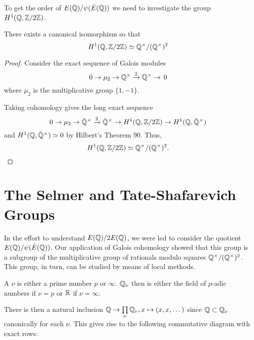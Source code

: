 \documentclass[12pt, a4paper]{report}
\begin{document}
To get the order of $E({\mathbb Q}) / \psi(\bar{E}({\mathbb Q}))$ we need to investigate the group
$H^1({\mathbb Q}, {\mathbb Z}/2{\mathbb Z})$.

\begin{prop}
  There exists a canonical isomorphism so that
  \[H^1({\mathbb Q}, {\mathbb Z}/2{\mathbb Z}) \simeq {\mathbb Q}^{\times} / ({\mathbb Q}^{\times})^2\]
\end{prop}
\begin{proof}
Consider the exact sequence of Galois modules
\[0 \rightarrow \mu_2 \rightarrow {\mathbb Q}^{\times} \xrightarrow[]{2} {\mathbb Q}^{\times} \rightarrow
  \, 0 \]
where $\mu_2$ is the multiplicative group $\{1, -1\}.$
 
Taking cohomology gives the long exact sequence
\[ 0 \rightarrow \mu_2 \rightarrow \bar{{\mathbb Q}}^{\times} \xrightarrow[]{2} \bar{{\mathbb Q}}^{\times} \rightarrow H^1({\mathbb Q}, {\mathbb Z}/2{\mathbb Z})
  \rightarrow H^1({\mathbb Q}, \bar{{\mathbb Q}}^{\times})\]
and $H^1({\mathbb Q}, \bar{{\mathbb Q}}^{\times}) \simeq 0$ by Hilbert's Theorem 90. Thus,
\[H^1({\mathbb Q}, {\mathbb Z}/2{\mathbb Z}) \simeq {\mathbb Q}^{\times}/({\mathbb Q}^{\times})^2. \]
\end{proof}

\section{The Selmer and Tate-Shafarevich Groups}

In the effort to understand $E({\mathbb Q})/2E({\mathbb Q})$, we were led to consider the quotient
$E({\mathbb Q}) / \psi(\bar{E}({\mathbb Q}))$. Our application of Galois cohomology showed that this
group is a subgroup of the multiplicative group of rationals modulo squares
${\mathbb Q}^{\times} / ({\mathbb Q}^{\times})^2$. This group, in turn, can be studied by means
of local methods.

\begin{defn}
  A  $\nu$ is either a prime number $p$ or $\infty$. ${\mathbb Q}_\nu$ then is
  either the field of $p$-adic numbers if $\nu = p$ or ${\mathbb R}$ if $\nu = \infty$.
\end{defn}

There is then a natural inclusion ${\mathbb Q} \rightarrow \prod\limits_\nu {\mathbb Q}_\nu,
x \mapsto (x, x, \dots)$ since ${\mathbb Q} \subset {\mathbb Q}_{\nu}$ canonically for each
$\nu$. This gives rise to the following commutative diagram with exact rows:

\end{document}
